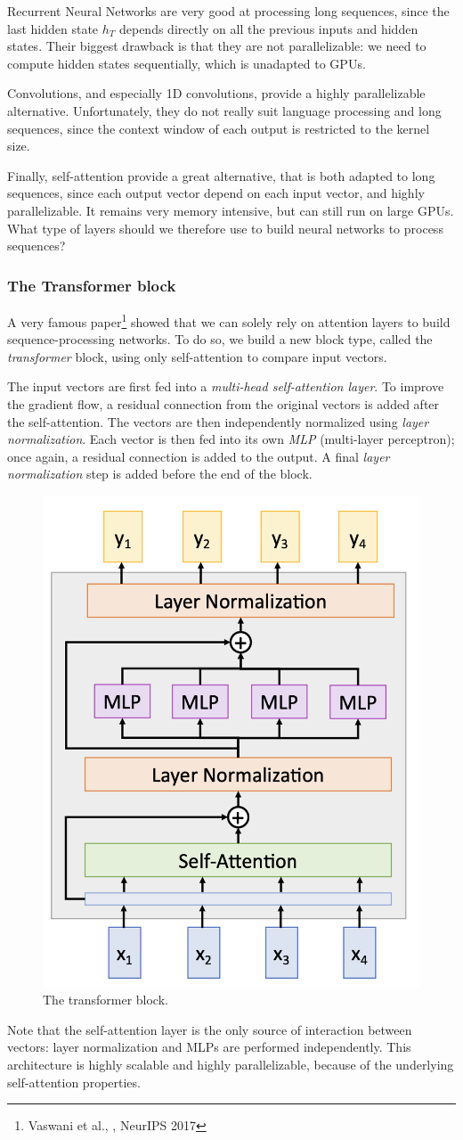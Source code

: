 Recurrent Neural Networks are very good at processing long sequences, since the last hidden state $h_T$ depends directly on all the previous inputs and hidden states. Their biggest drawback is that they are not parallelizable: we need to compute hidden states sequentially, which is unadapted to GPUs. 

Convolutions, and especially 1D convolutions, provide a highly parallelizable alternative. Unfortunately, they do not really suit language processing and long sequences, since the context window of each output is restricted to the kernel size.

Finally, self-attention provide a great alternative, that is both adapted to long sequences, since each output vector depend on each input vector, and highly parallelizable. It remains very memory intensive, but can still run on large GPUs. What type of layers should we therefore use to build neural networks to process sequences?

\subsubsection{The Transformer block}
A very famous paper\footnote{Vaswani et al., , NeurIPS 2017} showed that we can solely rely on attention layers to build sequence-processing networks. To do so, we build a new block type, called the \emph{transformer} block, using only self-attention to compare input vectors.

The input vectors are first fed into a \emph{multi-head self-attention layer}. To improve the gradient flow, a residual connection from the original vectors is added after the self-attention. The vectors are then independently normalized using \emph{layer normalization}. Each vector is then fed into its own \emph{MLP} (multi-layer perceptron); once again, a residual connection is added to the output. A final \emph{layer normalization} step is added before the end of the block.
\begin{figure}[H]
    \centering
    \includegraphics[width=.4\textwidth]{images/transformer-block.png}
    \caption{The transformer block.}
\end{figure}
Note that the self-attention layer is the only source of interaction between vectors: layer normalization and MLPs are performed independently. This architecture is highly scalable and highly parallelizable, because of the underlying self-attention properties.

